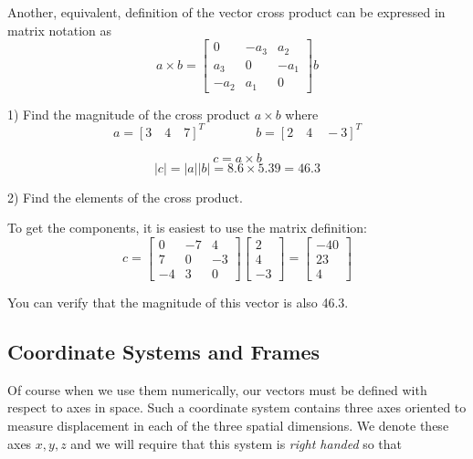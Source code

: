 Another, equivalent, definition of the vector cross product can be expressed in matrix notation as
\[
a\times b = \left [
\begin{array}{ccc}
0 & -a_3 & a_2 \\
a_3 & 0 & -a_1 \\
-a_2 & a_1 & 0 \end{array} \right]
b
\]




\begin{ExampleSmall}
1) Find the magnitude of the cross product $a \times b$ where
\[
a = [ 3 \quad 4 \quad 7]^T \qquad \qquad  b = [ 2 \quad 4 \quad-3]^T
\]

\vspace{0.2in}

\[
c = a \times b
\]
\[
|c| = |a||b| = 8.6 \times 5.39 = 46.3
\]

2) Find the elements of the cross product.

\vspace{0.2in}
To get the components, it is easiest to use the matrix definition:
\[
c = \left [
\begin{array}{ccc}
0 & -7 & 4 \\
7 & 0 & -3 \\
-4 & 3 & 0 \end{array} \right]
\left [
\begin{array}{c}
2 \\ 4 \\ -3
\end{array}
\right ]        =
\left [
\begin{array}{c}
-40 \\ 23 \\ 4
\end{array}
\right ]
\]

You can verify that the magnitude of this vector is also 46.3.
\end{ExampleSmall}




\subsection{Coordinate Systems and Frames}

Of course when we use them numerically, our vectors must be defined with respect to axes in space.   Such a coordinate system contains three axes oriented to measure displacement in each of the three spatial dimensions.   We denote these axes $x,y,z$ and we will require that this system is {\it right handed} so that

